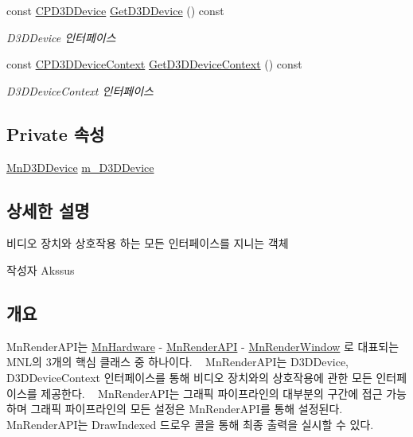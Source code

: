 \begin{DoxyCompactItemize}
const \hyperlink{namespace_m_n_l_a1eec210db8f309a4a9ac0d9658784c31}{C\+P\+D3\+D\+Device} \hyperlink{class_m_n_l_1_1_mn_render_a_p_i_af7dac77c07b794fc4ff298db83f0d84d}{Get\+D3\+D\+Device} () const
\begin{DoxyCompactList}\small\item\em D3\+D\+Device 인터페이스 \end{DoxyCompactList}\item 
const \hyperlink{namespace_m_n_l_aab3aabb6c9360e44ddc8b0bb563c2107}{C\+P\+D3\+D\+Device\+Context} \hyperlink{class_m_n_l_1_1_mn_render_a_p_i_a945fe3f0b1b917376ea3dbfd051c7fe7}{Get\+D3\+D\+Device\+Context} () const
\begin{DoxyCompactList}\small\item\em D3\+D\+Device\+Context 인터페이스 \end{DoxyCompactList}\end{DoxyCompactItemize}
\subsection*{Private 속성}
\begin{DoxyCompactItemize}
\item 
\hyperlink{class_m_n_l_1_1_mn_d3_d_device}{Mn\+D3\+D\+Device} \hyperlink{class_m_n_l_1_1_mn_render_a_p_i_ac276c60417e41b5cfdb7471da6a6bcdb}{m\+\_\+\+D3\+D\+Device}
\end{DoxyCompactItemize}


\subsection{상세한 설명}
비디오 장치와 상호작용 하는 모든 인터페이스를 지니는 객체 

\begin{DoxyAuthor}{작성자}
Akssus 
\end{DoxyAuthor}
\hypertarget{class_m_n_l_1_1_mn_video_adapter_개요}{}\subsection{개요}\label{class_m_n_l_1_1_mn_video_adapter_개요}
Mn\+Render\+A\+P\+I는 \hyperlink{class_m_n_l_1_1_mn_hardware}{Mn\+Hardware} -\/ \hyperlink{class_m_n_l_1_1_mn_render_a_p_i}{Mn\+Render\+A\+PI} -\/ \hyperlink{class_m_n_l_1_1_mn_render_window}{Mn\+Render\+Window} 로 대표되는 M\+N\+L의 3개의 핵심 클래스 중 하나이다. ~\newline
Mn\+Render\+A\+P\+I는 D3\+D\+Device, D3\+D\+Device\+Context 인터페이스를 통해 비디오 장치와의 상호작용에 관한 모든 인터페이스를 제공한다. ~\newline
Mn\+Render\+A\+P\+I는 그래픽 파이프라인의 대부분의 구간에 접근 가능하며 그래픽 파이프라인의 모든 설정은 Mn\+Render\+A\+P\+I를 통해 설정된다. ~\newline
Mn\+Render\+A\+P\+I는 Draw\+Indexed 드로우 콜을 통해 최종 출력을 실시할 수 있다. 

